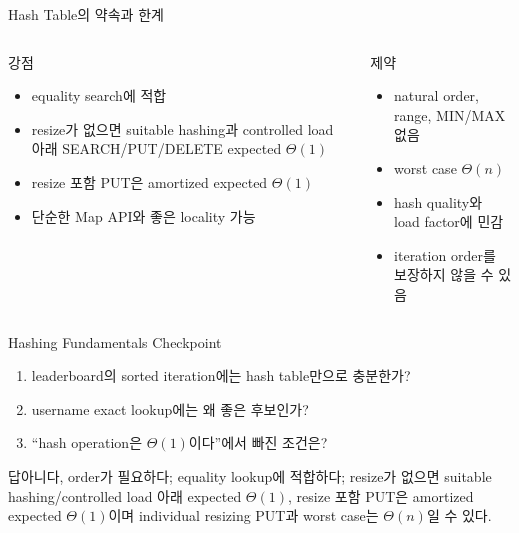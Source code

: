 \begin{frame}{Hash Table의 약속과 한계}
\small
\begin{columns}[T]
\begin{block}{강점}
\begin{itemize}
\item equality search에 적합
\item resize가 없으면 suitable hashing과 controlled load 아래 SEARCH/PUT/DELETE expected $\Theta(1)$
\item resize 포함 PUT은 amortized expected $\Theta(1)$
\item 단순한 Map API와 좋은 locality 가능
\end{itemize}
\end{block}
\begin{alertblock}{제약}
\begin{itemize}\item natural order, range, MIN/MAX 없음\item worst case $\Theta(n)$\item hash quality와 load factor에 민감\item iteration order를 보장하지 않을 수 있음\end{itemize}
\end{alertblock}
\end{columns}
\end{frame}
\begin{frame}{Hashing Fundamentals Checkpoint}
\begin{enumerate}
\item leaderboard의 sorted iteration에는 hash table만으로 충분한가?
\item username exact lookup에는 왜 좋은 후보인가?
\item “hash operation은 $\Theta(1)$이다”에서 빠진 조건은?
\end{enumerate}
\begin{exampleblock}{답}아니다, order가 필요하다; equality lookup에 적합하다; resize가 없으면 suitable hashing/controlled load 아래 expected $\Theta(1)$, resize 포함 PUT은 amortized expected $\Theta(1)$이며 individual resizing PUT과 worst case는 $\Theta(n)$일 수 있다.\end{exampleblock}
\end{frame}
